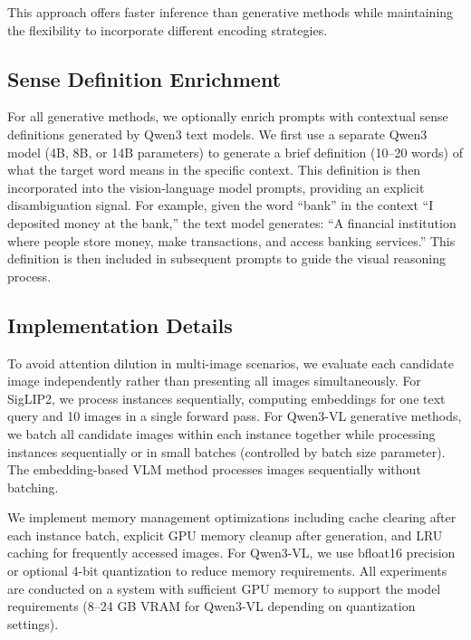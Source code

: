 \documentclass[11pt]{article}
\begin{document}
This approach offers faster inference than generative methods while maintaining the flexibility to incorporate different encoding strategies.

\subsection{Sense Definition Enrichment}
\label{subsec:definition_enrichment}

For all generative methods, we optionally enrich prompts with contextual sense definitions generated by Qwen3 text models. We first use a separate Qwen3 \cite{yang2025qwen3}model (4B, 8B, or 14B parameters) to generate a brief definition (10--20 words) of what the target word means in the specific context. This definition is then incorporated into the vision-language model prompts, providing an explicit disambiguation signal. For example, given the word ``bank'' in the context ``I deposited money at the bank,'' the text model generates: ``A financial institution where people store money, make transactions, and access banking services.'' This definition is then included in subsequent prompts to guide the visual reasoning process.

\subsection{Implementation Details}
\label{subsec:implementation}

To avoid attention dilution in multi-image scenarios, we evaluate each candidate image independently rather than presenting all images simultaneously. For SigLIP2, we process instances sequentially, computing embeddings for one text query and 10 images in a single forward pass. For Qwen3-VL generative methods, we batch all candidate images within each instance together while processing instances sequentially or in small batches (controlled by batch size parameter). The embedding-based VLM method processes images sequentially without batching.

We implement memory management optimizations including cache clearing after each instance batch, explicit GPU memory cleanup after generation, and LRU caching for frequently accessed images. For Qwen3-VL, we use bfloat16 precision or optional 4-bit quantization to reduce memory requirements. All experiments are conducted on a system with sufficient GPU memory to support the model requirements (8--24 GB VRAM for Qwen3-VL depending on quantization settings).
\end{document}
